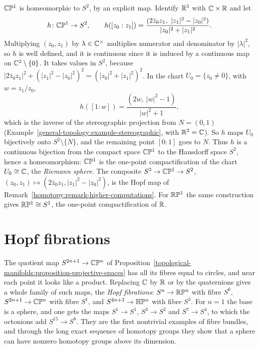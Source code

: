 \begin{example}\label{topological-manifolds:example-cp1-sphere}
$\mathbb{C}\mathbb{P}^1$ is homeomorphic to $S^2$, by an explicit map. Identify $\mathbb{R}^3$ with $\mathbb{C} \times \mathbb{R}$ and let
\[
h \colon \mathbb{C}\mathbb{P}^1 \to S^2, \qquad h([z_0 : z_1]) = \frac{(2\bar{z}_0z_1, \ |z_1|^2 - |z_0|^2)}{|z_0|^2 + |z_1|^2}.
\]
Multiplying $(z_0, z_1)$ by $\lambda \in \mathbb{C}^\times$ multiplies numerator and denominator by $|\lambda|^2$, so $h$ is well defined, and it is continuous since it is
induced by a continuous map on $\mathbb{C}^2 \setminus \{0\}$. It takes values in $S^2$, because
$|2\bar{z}_0z_1|^2 + (|z_1|^2 - |z_0|^2)^2 = (|z_0|^2 + |z_1|^2)^2$. In the chart $U_0 = \{z_0 \neq 0\}$, with $w = z_1/z_0$,
\[
h([1 : w]) = \frac{(2w, \ |w|^2 - 1)}{|w|^2 + 1},
\]
which is the inverse of the stereographic projection from $N = (0, 1)$ (Example~\ref{general-topology:example-stereographic}, with $\mathbb{R}^2 = \mathbb{C}$). So $h$ maps
$U_0$ bijectively onto $S^2 \setminus \{N\}$, and the remaining point $[0 : 1]$ goes to $N$. Thus $h$ is a continuous bijection from the compact space $\mathbb{C}\mathbb{P}^1$ to
the Hausdorff space $S^2$, hence a homeomorphism: $\mathbb{C}\mathbb{P}^1$ is the one-point compactification of the chart $U_0 \cong \mathbb{C}$, the \emph{Riemann sphere}. The
composite $S^3 \to \mathbb{C}\mathbb{P}^1 \to S^2$, $(z_0, z_1) \mapsto (2\bar{z}_0z_1, |z_1|^2 - |z_0|^2)$, is the Hopf map of Remark~\ref{homotopy:remark-higher-computations}.
For $\mathbb{R}\mathbb{P}^1$ the same construction gives $\mathbb{R}\mathbb{P}^1 \cong S^1$, the one-point compactification of $\mathbb{R}$.
\end{example}

\section{Hopf fibrations}\label{topological-manifolds:section-hopf}

The quotient map $S^{2n+1} \to \mathbb{C}\mathbb{P}^n$ of Proposition~\ref{topological-manifolds:proposition-projective-spaces} has all its fibres equal to circles, and near each point it looks like a
product. Replacing $\mathbb{C}$ by $\mathbb{R}$ or by the quaternions gives a whole family of such maps, the \emph{Hopf fibrations}: $S^n \to \mathbb{R}\mathbb{P}^n$ with fibre $S^0$, $S^{2n+1} \to \mathbb{C}\mathbb{P}^n$ with fibre $S^1$, and
$S^{4n+3} \to \mathbb{H}\mathbb{P}^n$ with fibre $S^3$. For $n = 1$ the base is a sphere, and one gets the maps $S^1 \to S^1$, $S^3 \to S^2$ and $S^7 \to S^4$, to which the octonions add $S^{15} \to S^8$. They are
the first nontrivial examples of fibre bundles, and through the long exact sequence of homotopy groups they show that a sphere can have nonzero homotopy groups above its dimension.

